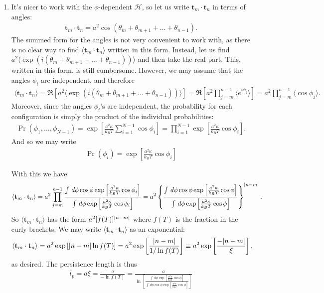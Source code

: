 \documentclass{article}
\theoremstyle{definition}
\newcommand{\ham}{\mathcal{H}}
\newcommand{\f}[2]{\frac{#1}{#2}}
\newcommand{\lb}{\left[}
\newcommand{\rb}{\right]}
\newcommand{\lc}{\left\{}
\newcommand{\rc}{\right\}}
\begin{document}
\begin{enumerate}[label=(\alph*)]
	\item It's nicer to work with the $\phi$-dependent $\ham$, so let us write $\mathbf{t}_m \cdot \mathbf{t}_n$ in terms of angles:
	\begin{align*}
	\mathbf{t}_m \cdot \mathbf{t}_n = 	a^2 \cos(\theta_m + \theta_{m+1} + \dots + \theta_{n-1}).
	\end{align*}
	The summed form for the angles is not very convenient to work with, as there is no clear way to find $\langle \mathbf{t}_m \cdot \mathbf{t}_n \rangle$ written in this form. Instead, let us find $a^2 \langle \exp(i(\theta_m + \theta_{m+1}+\dots + \theta_{n-1})) \rangle $ and then take the real part. This, written in this form, is still cumbersome. However, we may assume that the angles $\phi_i$ are independent, and therefore 
	\begin{align*}
	\langle \mathbf{t}_m \cdot \mathbf{t}_n \rangle = \Re \lb a^2 \langle \exp(i(\theta_m + \theta_{m+1}+\dots + \theta_{n-1})) \rangle \rb = \Re \lb a^2\prod^{n-1}_{j=m} \langle e^{i\phi_j} \rangle \rb = a^2 \prod^{n-1}_{j=m} \langle \cos\phi_j \rangle. 
	\end{align*}
	Moreover, since the angles $\phi_i$'s are independent, the probability for each configuration is simply the product of the individual probabilities:
	\begin{align*}
	\Pr (\phi_1,\dots,\phi_{N-1}) = \exp\lb \f{a^2 \kappa}{k_BT} \sum_{i=1}^{N-1} \cos\phi_i\rb = \prod^{N-1}_{i=1}\exp\lb \f{a^2\kappa}{k_BT} \cos\phi_i\rb .
	\end{align*}
	And so we may write
	\begin{align*}
	\Pr (\phi_i) = \exp\lb \f{a^2\kappa}{k_BT} \cos\phi_i \rb
	\end{align*}
	
	With this we have
	\begin{align*}
	\langle \mathbf{t}_m \cdot \mathbf{t}_n \rangle = a^2 \prod^{n-1}_{j=m}  \f{\int \,d\phi \cos\phi \exp\lb \f{a^2\kappa}{k_BT} \cos\phi_i\rb}{\int \,d\phi \exp\lb \f{a^2\kappa}{k_BT} \cos\phi_i\rb} = a^2 \lc \f{\int \,d\phi \cos\phi \exp\lb \f{a^2\kappa}{k_BT} \cos\phi\rb}{\int \,d\phi \exp\lb \f{a^2\kappa}{k_BT} \cos\phi\rb}   \rc^{\abs{n-m}}.
	\end{align*}
	So $\langle \mathbf{t}_m \cdot \mathbf{t}_n \rangle$ has the form $a^2 [f(T)]^{\abs{n-m}}$ where $f(T)$ is the fraction in the curly brackets. We may write $\langle \mathbf{t}_m \cdot \mathbf{t}_n \rangle$ as an exponential: 
	\begin{align*}
	\langle \mathbf{t}_m \cdot \mathbf{t}_n \rangle = a^2 \exp\lb \abs{n-m}\ln f(T) \rb = a^2 \exp\lb \f{\abs{n-m}}{1/\ln f(T)} \rb \equiv a^2 \exp\lb \f{-\abs{n-m}}{\xi} \rb,
	\end{align*}
	as desired. The persistence length is thus
	\begin{align*}
	\boxed{l_p = a\xi = \f{a}{-\ln f(T)} = \f{a}{\ln \lb \f{\int \,d\phi \exp\lb \f{a^2\kappa}{k_BT} \cos\phi\rb}{\int \,d\phi \cos\phi \exp\lb \f{a^2\kappa}{k_BT} \cos\phi\rb}   \rb}}
	\end{align*}
	

\end{enumerate}
\end{document}
